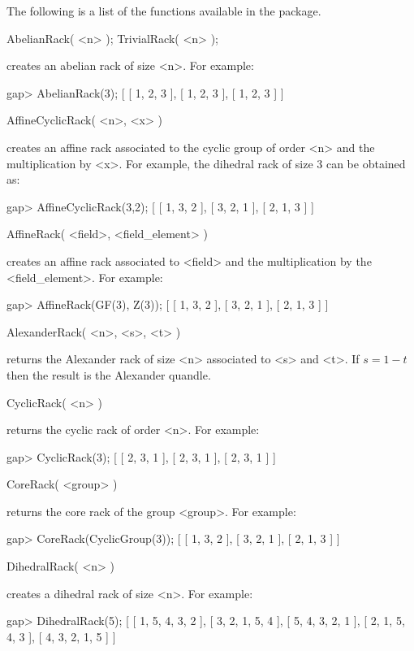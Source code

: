 
The following is a list of the functions available in the {\RiG} package. 

\>AbelianRack( <n> );
\>TrivialRack( <n> );

creates an abelian rack of size <n>. For example:

\beginexample
gap> AbelianRack(3);
[ [  1,  2,  3 ],
  [  1,  2,  3 ],
  [  1,  2,  3 ] ]
\endexample

\>AffineCyclicRack( <n>, <x> )

creates an affine rack associated to the cyclic group of order <n> and
the multiplication by <x>. For example, the dihedral rack of size 3
can be obtained as:

\beginexample
gap> AffineCyclicRack(3,2);
[ [  1,  3,  2 ],
  [  3,  2,  1 ],
  [  2,  1,  3 ] ]
\endexample

\>AffineRack( <field>, <field_element> )

creates an affine rack associated to <field> and the multiplication
by the <field_element>. For example:

\beginexample
gap> AffineRack(GF(3), Z(3));
[ [  1,  3,  2 ],
  [  3,  2,  1 ],
  [  2,  1,  3 ] ]
\endexample

\>AlexanderRack( <n>, <s>, <t> )

returns the Alexander rack of size <n> associated to <s> and <t>.
If $s=1-t$ then the result is the Alexander quandle.

\>CyclicRack( <n> )

returns the cyclic rack of order <n>. For example:

\beginexample
gap> CyclicRack(3);
[ [ 2,  3,  1 ],
  [ 2,  3,  1 ],
  [ 2,  3,  1 ] ]
\endexample

\>CoreRack( <group> )

returns the core rack of the group <group>. For example:

\beginexample
gap> CoreRack(CyclicGroup(3));
[ [  1,  3,  2 ],
  [  3,  2,  1 ],
  [  2,  1,  3 ] ]
\endexample

\>DihedralRack( <n> ) 

creates a dihedral rack of size <n>. For example:

\beginexample
gap> DihedralRack(5);
[ [  1,  5,  4,  3,  2 ],
  [  3,  2,  1,  5,  4 ],
  [  5,  4,  3,  2,  1 ],
  [  2,  1,  5,  4,  3 ],
  [  4,  3,  2,  1,  5 ] ]
\endexample

